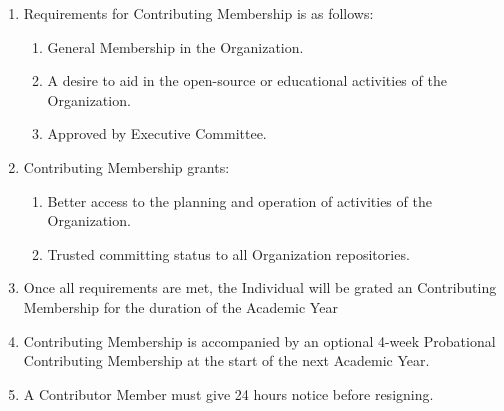 \begin{enumerate}
	\item Requirements for Contributing Membership is as follows:
		\begin{enumerate}
			\item General Membership in the Organization.

			\item A desire to aid in the open-source or educational activities of the Organization.

			\item Approved by Executive Committee.
		\end{enumerate}

	\item Contributing Membership grants:
		\begin{enumerate}
			\item Better access to the planning and operation of activities of the Organization.

			\item Trusted committing status to all Organization repositories.
		\end{enumerate}

	\item Once all requirements are met, the Individual will be grated an
		Contributing Membership for the duration of the Academic Year

	\item Contributing Membership is accompanied by an optional 4-week Probational
		Contributing Membership at the start of the next Academic Year.

	\item A Contributor Member must give 24 hours notice before resigning.
\end{enumerate}

